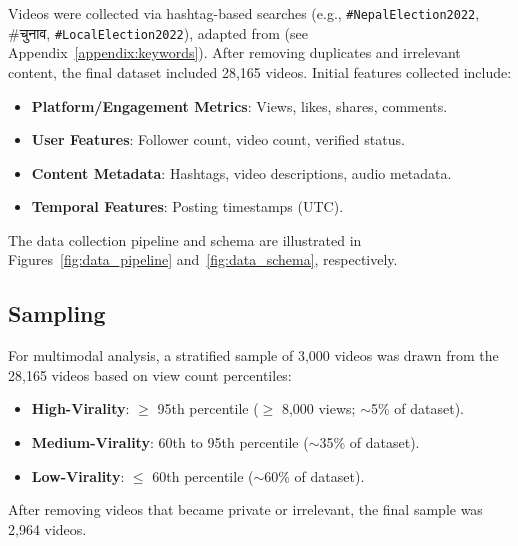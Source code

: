 \documentclass[12pt,a4paper]{report}
\begin{document}
Videos were collected via hashtag-based searches (e.g., \texttt{\#NepalElection2022}, \texthindi{\#चुनाव}, \texttt{\#LocalElection2022}), adapted from \parencite{pinto2024} (see Appendix~\ref{appendix:keywords}). After removing duplicates and irrelevant content, the final dataset included 28,165 videos. Initial features collected include:
\begin{itemize}
    \item \textbf{Platform/Engagement Metrics}: Views, likes, shares, comments.
    \item \textbf{User Features}: Follower count, video count, verified status.
    \item \textbf{Content Metadata}: Hashtags, video descriptions, audio metadata.
    \item \textbf{Temporal Features}: Posting timestamps (UTC).
\end{itemize}
The data collection pipeline and schema are illustrated in Figures~\ref{fig:data_pipeline} and~\ref{fig:data_schema}, respectively.

\subsection{Sampling}
For multimodal analysis, a stratified sample of 3,000 videos was drawn from the 28,165 videos based on view count percentiles:
\begin{itemize}
    \item \textbf{High-Virality}: $\geq$ 95th percentile ($\geq$ 8,000 views; $\sim$5\% of dataset).
    \item \textbf{Medium-Virality}: 60th to 95th percentile ($\sim$35\% of dataset).
    \item \textbf{Low-Virality}: $\leq$ 60th percentile ($\sim$60\% of dataset).
\end{itemize}
After removing videos that became private or irrelevant, the final sample was 2,964 videos.
\end{document}
